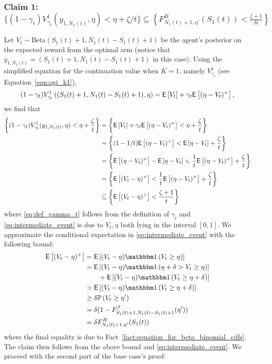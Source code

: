 \begin{myproof}[Proof.]
	\subsubsection*{Claim 1: $\{(1-\gamma_t)V^1_{\gamma_t}(y_{1,N_1(t)}, \eta) < \eta + \zeta/t\} \subseteq \left\{F^B_{N_1(t)+1, \eta'}(S_1(t)) < \frac{\zeta + 1}{\delta t}\right\}$}
	Let $V_t \sim $Beta$(S_1(t)+1,N_1(t) - S_1(t) + 1)$ be the agent's posterior on the expected reward from the optimal arm (notice that $y_{1,N_1(t)} = (S_1(t)+1,N_1(t) - S_1(t) + 1)$ in this case). Using the simplified equation for the continuation value when $K =1$, namely $V^1_{\gamma_t}$ (see Equation~\eqref{eqn:ogi_k1}), 
	\[
		(1-\gamma_t)V^1_{\gamma_t}\left((S_1(t)+1, N_1(t) - S_1(t) + 1), \eta\right) = \mathsf{E} \left[ V_t \right] + \gamma_t\mathsf{E} \left[ (\eta - V_t)^+ \right],
	\] 
	we find that
	\begin{align}
	\left\{(1-\gamma_t)V^1_{\gamma_t}(y_{1,N_{1}(t)}, \eta) < \eta + \frac{\zeta}{t}\right\} & = \left\{ \mathsf{E} \left[ V_t  \right] + \gamma_t\mathsf{E} \left[ (\eta - V_t)^+ \right] < \eta + \frac{\zeta}{t}\right\} \nonumber\\
	& =  \left\{ (1-1/t)\mathsf{E} \left[ (\eta - V_t)^+ \right] < \mathsf{E} \left[ \eta - V_t \right] +\frac{\zeta}{t} \right\} \label{eq:def_gamma_t} \\
	& =  \left\{ \mathsf{E} \left[ (\eta - V_t)^+ \right] - \mathsf{E} \left[ \eta - V_t \right] <  \frac{1}{t}\mathsf{E} \left[ (\eta - V_t)^+ \right] +\frac{\zeta}{t}\right\} \nonumber\\
	& =  \left\{ \mathsf{E} \left[ (V_t - \eta)^+ \right]<  \frac{1}{t}\mathsf{E} \left[ (\eta - V_t)^+ \right] +\frac{\zeta}{t}\right\} \nonumber\\
	& \subseteq \left\{ \mathsf{E} \left[  (V_t - \eta)^+ \right]< \frac{\zeta + 1}{t}  \right\} \label{eq:intermediate_event}
	\end{align}
	where \eqref{eq:def_gamma_t} follows from the definition of $\gamma_t$ and \eqref{eq:intermediate_event} is due to $V_t, \eta$ both lying in the interval $[0,1]$. We approximate the conditional expectation in \eqref{eq:intermediate_event} with the following bound:
	\begin{align}
	\Ee{(V_t - \eta)^+ } & = \Ee{(V_t - \eta) \ind{V_t \ge \eta} }\nonumber \\
	& = \Ee{(V_t - \eta) \ind{\eta + \delta > V_t \ge \eta} }  \nonumber \\
	& \qquad + \Ee{(V_t - \eta) \ind{ V_t \ge \eta + \delta} } \nonumber \\
	& > \Ee{(V_t - \eta) \ind{ V_t \ge \eta + \delta} } \nonumber \\
	& \ge \delta\P{ V_t \ge \eta' } \nonumber \\
	& = \delta (1 - F^\beta_{S_1(t)+1,N_1(t)-S_1(t)+1}(\eta'))  \nonumber\\ 
	& = \delta F^B_{N_1(t)+1,\eta'}(S_1(t)) \label{ineq:lower_bound_on_ppart_term}
	\end{align}
	where the final equality is due to Fact~\ref{fact:equation_for_beta_binomial_cdfs}. The claim then follows from the above bound and \eqref{eq:intermediate_event}. We proceed with the second part of the base case's proof:

\end{myproof}
